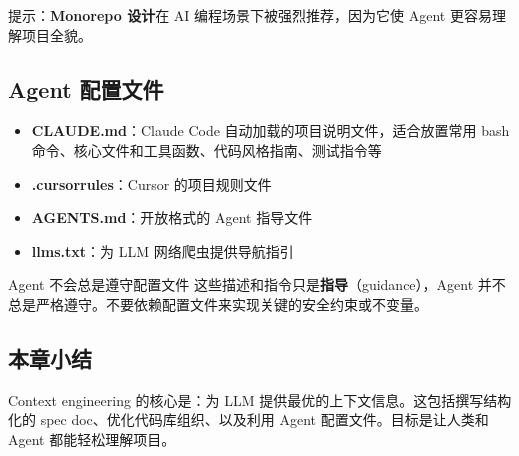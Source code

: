 提示：\textbf{Monorepo 设计}在 AI 编程场景下被强烈推荐，因为它使 Agent 更容易理解项目全貌。

\subsection{Agent 配置文件}

\begin{itemize}
    \item \textbf{CLAUDE.md}：Claude Code 自动加载的项目说明文件，适合放置常用 bash 命令、核心文件和工具函数、代码风格指南、测试指令等
    \item \textbf{.cursorrules}：Cursor 的项目规则文件
    \item \textbf{AGENTS.md}：开放格式的 Agent 指导文件
    \item \textbf{llms.txt}：为 LLM 网络爬虫提供导航指引
\end{itemize}

\begin{warningbox}{Agent 不会总是遵守配置文件}
这些描述和指令只是\textbf{指导}（guidance），Agent 并不总是严格遵守。不要依赖配置文件来实现关键的安全约束或不变量。
\end{warningbox}

\subsection{本章小结}

Context engineering 的核心是：为 LLM 提供最优的上下文信息。这包括撰写结构化的 spec doc、优化代码库组织、以及利用 Agent 配置文件。目标是让人类和 Agent 都能轻松理解项目。

